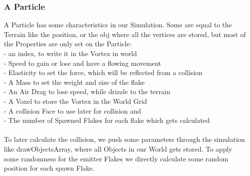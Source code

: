 \documentclass{sig-alternate-05-2015}
\begin{document}
\subsubsection{A Particle}
A Particle has some characteristics in our Simulation. Some are equal to the Terrain like the position, or the obj where all the vertices are stored, but most of the Properties are only set on the Particle:\\
-	an index, to write it in the Vortex in world\\
-	Speed to gain or lose and have a flowing movement\\
-	Elasticity to set the force, which will be reflected from a collision\\
-	A Mass to set the weight and size of the flake\\
-	An Air Drag to lose speed, while drizzle to the terrain\\
-	A Voxel to store the Vortex in the World Grid\\
-	A collision Face to use later for collision and \\
-	The number of Spawned Flakes for each flake which gets calculated\\
\\
To later calculate the collision, we push some parameters through the simulation like drawObjectsArray, where all Objects in our World gets stored. To apply some randomness for the emitter Flakes we directly calculate some random position for each spawn Flake. \\
\end{document}

